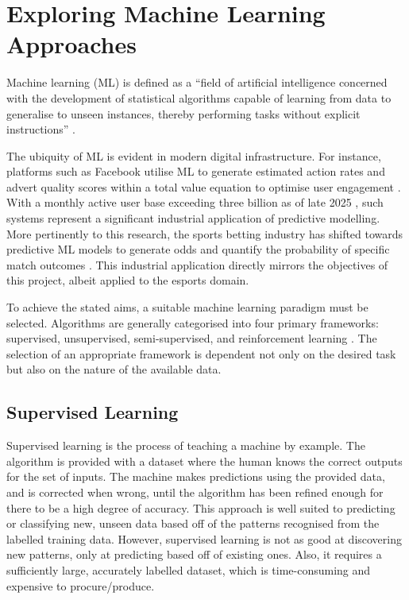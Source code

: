 \section{Exploring Machine Learning Approaches}
Machine learning (ML) is defined as a ``field of artificial intelligence concerned with the development of statistical algorithms capable of learning from data to generalise to unseen instances, thereby performing tasks without explicit instructions'' \cite{Koza1996}.

The ubiquity of ML is evident in modern digital infrastructure. For instance, platforms such as Facebook utilise ML to generate estimated action rates and advert quality scores within a total value equation to optimise user engagement \cite{Facebook2020}. With a monthly active user base exceeding three billion as of late 2025 \cite{NaveenKumar2025}, such systems represent a significant industrial application of predictive modelling. More pertinently to this research, the sports betting industry has shifted towards predictive ML models to generate odds and quantify the probability of specific match outcomes \cite{RhysGregory2025}. This industrial application directly mirrors the objectives of this project, albeit applied to the esports domain.

To achieve the stated aims, a suitable machine learning paradigm must be selected. Algorithms are generally categorised into four primary frameworks: supervised, unsupervised, semi-supervised, and reinforcement learning \cite{Sarker2021}. The selection of an appropriate framework is dependent not only on the desired task but also on the nature of the available data.
 
\subsection*{Supervised Learning}
Supervised learning is the process of teaching a machine by example. The algorithm is provided with a dataset where the human knows the correct outputs for the set of inputs. The machine makes predictions using the provided data, and is corrected when wrong, until the algorithm has been refined enough for there to be a high degree of \gls{accuracy}. This approach is well suited to predicting or classifying new, unseen data based off of the patterns recognised from the labelled training data. However, supervised learning is not as good at discovering new patterns, only at predicting based off of existing ones. Also, it requires a sufficiently large, accurately labelled dataset, which is time-consuming and expensive to procure/produce. \cite{SupervisedLearning}

